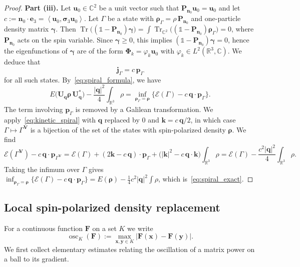 \documentclass[final,reqno]{amsart}
\theoremstyle{remark}
\renewcommand{\ge}{\geqslant}
\let\phi=\varphi
\DeclareMathOperator{\Tr}{Tr}
\newcommand{\Trs}{\Tr_{\CC^2}}
\newcommand{\RR}{\mathbb{R}}
\newcommand{\CC}{\mathbb{C}}
\newcommand{\pscal}[1]{\left\langle #1 \right\rangle}
\newcommand{\iden}{\mathbb{1}}
\newcommand{\EC}{\mathcal{E}}
\begin{document}
\begin{proof}
\noindent\textbf{Part (iii).} Let $\mathbf{u}_0\in\CC^2$ be a unit vector such that $\mathbf{P}_{\mathbf{n}_0}\mathbf{u}_0=\mathbf{u}_0$ and let $c:=\mathbf{n}_0\cdot\mathbf{e}_3=\pscal{\mathbf{u}_0,\bm{\sigma}_3\mathbf{u}_0}$. Let $\Gamma$ be a state with $\bm{\rho}_\Gamma=\rho\,\mathbf{P}_{\mathbf{n}_0}$ and one-particle density matrix $\bm{\gamma}$. Then $\Tr\big((\iden-\mathbf{P}_{\mathbf{n}_0})\bm{\gamma}\big)=\int\Trs\big((\iden-\mathbf{P}_{\mathbf{n}_0})\bm{\rho}_\Gamma\big)=0$, where $\mathbf{P}_{\mathbf{n}_0}$ acts on the spin variable. Since $\bm{\gamma}\ge0$, this implies $(\iden-\mathbf{P}_{\mathbf{n}_0})\bm{\gamma}=0$, hence the eigenfunctions of $\bm{\gamma}$ are of the form $\bm{\Phi}_k=\phi_k\mathbf{u}_0$ with $\phi_k\in L^2(\RR^3,\CC)$. We deduce that
$$
\mathbf{j}_\Gamma=c\,\mathbf{p}_\Gamma
$$
for all such states. By~\cref{eq:spiral_formula}, we have
$$
E\big(\mathbf{U}_{\mathbf{q}}\bm{\rho}\,\mathbf{U}_{\mathbf{q}}^*\big)-\frac{|\mathbf{q}|^2}{4}\int_{\RR^3}\rho=\inf_{\bm{\rho}_\Gamma=\bm{\rho}}\Big\{\EC(\Gamma)-c\,\mathbf{q}\cdot\mathbf{p}_\Gamma\Big\}.
$$
The term involving $\mathbf{p}_\Gamma$ is removed by a Galilean transformation. We apply~\cref{eq:kinetic_spiral} with $\mathbf{q}$ replaced by $0$ and $\mathbf{k}=c\,\mathbf{q}/2$, in which case $\Gamma\mapsto\Gamma^{\mathbf{V}}$ is a bijection of the set of the states with spin-polarized density $\bm{\rho}$. We find
$$
\EC(\Gamma^{\mathbf{V}})-c\,\mathbf{q}\cdot\mathbf{p}_{\Gamma^{\mathbf{V}}}=\EC(\Gamma)+(2\mathbf{k}-c\,\mathbf{q})\cdot\mathbf{p}_\Gamma+\big(|\mathbf{k}|^2-c\,\mathbf{q}\cdot\mathbf{k}\big)\int_{\RR^3}\rho=\EC(\Gamma)-\frac{c^2|\mathbf{q}|^2}{4}\int_{\RR^3}\rho.
$$
Taking the infimum over $\Gamma$ gives $\inf_{\bm{\rho}_\Gamma=\bm{\rho}}\{\EC(\Gamma)-c\,\mathbf{q}\cdot\mathbf{p}_\Gamma\}=E(\bm{\rho})-\frac14c^2|\mathbf{q}|^2\int\rho$, which is~\cref{eq:spiral_exact}.
\end{proof}

\subsection{Local spin-polarized density replacement}\label{sec:deviation_spiral}

For a continuous function $\mathbf{F}$ on a set $K$ we write
$$
\operatorname{osc}_K(\mathbf{F}):=\max_{\mathbf{x},\mathbf{y}\in K}|\mathbf{F}(\mathbf{x})-\mathbf{F}(\mathbf{y})|.
$$
We first collect elementary estimates relating the oscillation of a matrix power on a ball to its gradient.
\end{document}

